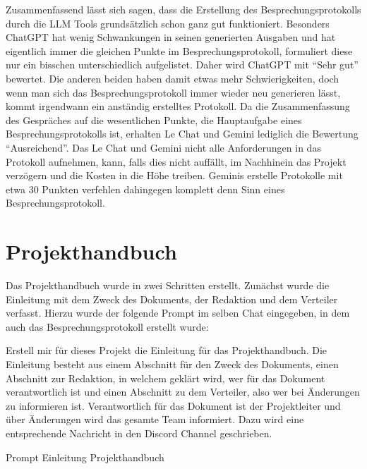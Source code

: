 Zusammenfassend lässt sich sagen, dass die Erstellung des Besprechungsprotokolls durch die LLM Tools grundsätzlich schon ganz gut 
funktioniert. Besonders ChatGPT hat wenig Schwankungen in seinen generierten Ausgaben und hat eigentlich immer die gleichen 
Punkte im Besprechungsprotokoll, formuliert diese nur ein bisschen unterschiedlich aufgelistet. Daher wird ChatGPT mit ``Sehr gut'' bewertet.
Die anderen beiden haben damit etwas mehr Schwierigkeiten, doch wenn man sich das Besprechungsprotokoll immer wieder neu generieren 
lässt, kommt irgendwann ein anständig erstelltes Protokoll. Da die Zusammenfassung des Gespräches auf die wesentlichen Punkte, die 
Hauptaufgabe eines Besprechungsprotokolls ist, erhalten Le Chat und Gemini lediglich die Bewertung ``Ausreichend''. Das Le Chat und 
Gemini nicht alle Anforderungen in das Protokoll aufnehmen, kann, falls dies nicht auffällt, im Nachhinein das Projekt verzögern 
und die Kosten in die Höhe treiben. Geminis erstelle Protokolle mit etwa 30 Punkten verfehlen dahingegen komplett denn Sinn eines
Besprechungsprotokoll.

\section{Projekthandbuch}  \label{CompProjekthandbuch}

Das Projekthandbuch wurde in zwei Schritten erstellt. Zunächst wurde die Einleitung mit dem Zweck des Dokuments, der Redaktion 
und dem Verteiler verfasst. Hierzu wurde der folgende Prompt im selben Chat eingegeben, in dem auch das Besprechungsprotokoll 
erstellt wurde:

\begin{prompt}[H]
    \begin{tcolorbox}[colback=gray!20, colframe=gray!20, boxrule=0pt, sharp corners] 
        Erstell mir für dieses Projekt die Einleitung für das Projekthandbuch. Die Einleitung besteht aus einem Abschnitt für 
        den Zweck des Dokuments, einen Abschnitt zur Redaktion, in welchem geklärt wird, wer für das Dokument verantwortlich ist 
        und einen Abschnitt zu dem Verteiler, also wer bei Änderungen zu informieren ist. Verantwortlich für das Dokument ist der 
        Projektleiter und über Änderungen wird das gesamte Team informiert. Dazu wird eine entsprechende Nachricht in den Discord 
        Channel geschrieben.
        \vfill
    \end{tcolorbox}
    \caption{Prompt Einleitung Projekthandbuch}
    \label{Prompt Einleitung Projekthandbuch}
\end{prompt}

